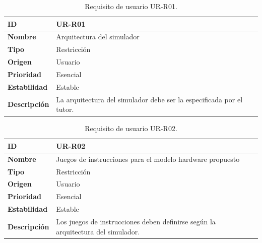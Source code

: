 \begin{center}
\begin{table}[htbp]
\centering
\begin{tabular}{@{}p{2.5cm} p{9cm}@{}} 
\toprule
\textbf{ID} 				& UR-R01 \\
\midrule
\textbf{Nombre} 			& Arquitectura del simulador \\
\midrule
\textbf{Tipo} 			& Restricción \\
\midrule
\textbf{Origen} 			& Usuario \\
\midrule
\textbf{Prioridad}		& Esencial \\
\midrule
\textbf{Estabilidad} 		& Estable \\
\midrule
\textbf{Descripción} 	& La arquitectura del simulador debe ser la especificada por el tutor. \\
\bottomrule
\end{tabular}
\caption{Requisito de usuario UR-R01.}
\label{tab:urr01}
\end{table}
\end{center}

\begin{center}
\begin{table}[htbp]
\centering
\begin{tabular}{@{}p{2.5cm} p{9cm}@{}} 
\toprule
\textbf{ID} 				& UR-R02 \\
\midrule
\textbf{Nombre} 			& Juegos de instrucciones para el modelo hardware propuesto \\
\midrule
\textbf{Tipo} 			& Restricción \\
\midrule
\textbf{Origen} 			& Usuario \\
\midrule
\textbf{Prioridad}		& Esencial \\
\midrule
\textbf{Estabilidad} 		& Estable \\
\midrule
\textbf{Descripción} 	& Los juegos de instrucciones deben definirse según la arquitectura del simulador. \\
\bottomrule
\end{tabular}
\caption{Requisito de usuario UR-R02.}
\label{tab:urr02}
\end{table}
\end{center}

